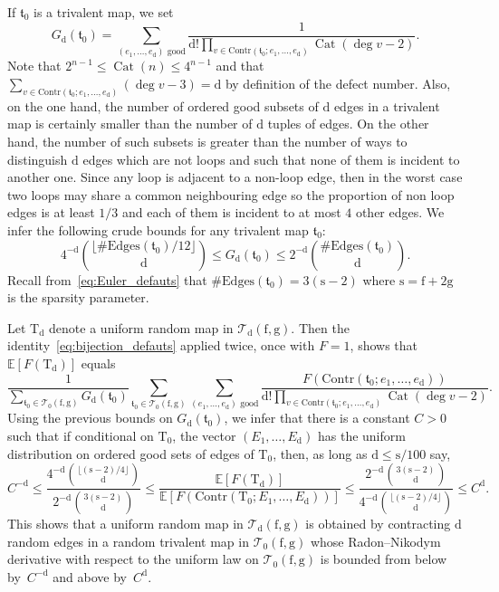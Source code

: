 \documentclass[11pt]{article}
\DeclareMathOperator{\Cat}{Cat}
\theoremstyle{plain}
\theoremstyle{definition}
\theoremstyle{remark}
\newcommand{\E}{\mathbb{E}}
\newcommand{\Triv}{\mathrm{T}}
\newcommand{\face}{\mathrm{f}}
\newcommand{\defect}{\mathrm{d}}
\newcommand{\gen}{\mathrm{g}}
\newcommand{\spar}{\mathrm{s}}
\begin{document}
If $\mathfrak{t}_0$ is a trivalent map, we set
\[
G_\defect(\mathfrak{t}_0) = \sum_{(e_1, \dots, e_{\defect}) \text{ good}} \frac{1}{\defect! \prod_{v \in \mathrm{Contr}(\mathfrak{t}_0 ; e_1, \dots, e_{\defect})} \Cat(\deg v - 2)}.
\]
Note that $2^{n-1} \le \Cat(n) \le 4^{n-1}$ and that $\sum_{v \in \mathrm{Contr}(\mathfrak{t}_0 ; e_1, \dots, e_{\defect})} (\deg v - 3) = \defect$ by definition of the defect number. Also, on the one hand, the number of ordered good subsets of $\defect$ edges in a trivalent map is certainly smaller than the number of $\defect$ tuples of edges.
On the other hand, the number of such subsets is greater than the number of ways to distinguish $\defect$ edges which are not loops and such that none of them is incident to another one. Since any loop is adjacent to a non-loop edge, then in the worst case two loops may share a common neighbouring edge so the proportion of non loop edges is at least $1/3$ and each of them is incident to at most $4$ other edges.
We infer the following crude bounds for any trivalent map $\mathfrak{t}_0$:
\[
4^{-\defect} \binom{\lfloor \#\mathrm{Edges}(\mathfrak{t}_0)/12\rfloor}{\defect} \le G_\defect(\mathfrak{t}_0) \le 2^{-\defect} \binom{\#\mathrm{Edges}(\mathfrak{t}_0)}{\defect}.
\]
Recall from~\eqref{eq:Euler_defauts} that $\#\mathrm{Edges}(\mathfrak{t}_0) = 3(\spar-2)$ where $\spar = \face+2\gen$ is the sparsity parameter.

Let $\Triv_\defect$ denote a uniform random map in $\mathcal{T}_{\defect}(\face,\gen)$. Then the identity~\eqref{eq:bijection_defauts} applied twice, once with $F=1$, shows that $\E[F(\Triv_{ \defect})]$ equals
\[
\frac{1}{\sum_{\mathfrak{t}_0 \in \mathcal{T}_0(\face, \gen)} G_\defect(\mathfrak{t}_0)} \sum_{\mathfrak{t}_0 \in \mathcal{T}_0(\face, \gen)} \sum_{(e_1, \dots, e_\defect) \text{ good}} \frac{F(\mathrm{Contr}(\mathfrak{t}_0 ; e_1, \dots, e_\defect))}{\defect! \prod_{v \in \mathrm{Contr}(\mathfrak{t}_0 ; e_1, \dots, e_\defect)} \Cat(\deg v - 2)}.
\]
Using the previous bounds on $G_\defect(\mathfrak{t}_0)$, we infer that there is a constant $C>0$ such that if conditional on $\Triv_0$, the vector $(E_1, \dots, E_\defect)$ has the uniform distribution on ordered good sets of edges of $\Triv_0$, then, as long as $ \defect \le \spar/100$ say,
\begin{equation} \label{eq:RNexp}
C^{-\defect}
\le \frac{4^{-\defect} \binom{\lfloor (\spar-2)/4\rfloor}{\defect}}{2^{-\defect} \binom{3 (\spar-2)}{\defect}}
\le \frac{\E[F(\Triv_{ \defect})]}{\E[F(\mathrm{Contr}(\Triv_0 ; E_1, \dots, E_\defect))]}
\le \frac{2^{-\defect} \binom{3 (\spar-2)}{\defect}}{4^{-\defect} \binom{\lfloor (\spar-2)/4\rfloor}{\defect}}
\le C^\defect.
\end{equation}
This shows that a uniform random map in $\mathcal{T}_{\defect}(\face,\gen)$ is obtained by contracting $ \defect$ random edges in a random trivalent map in $\mathcal{T}_{0}(\face, \gen)$ whose Radon--Nikodym derivative with respect to the uniform law on $\mathcal{T}_{0}(\face, \gen)$ is bounded from below by~$C^{- \defect}$ and above by~$C^{ \defect}$.
\end{document}
